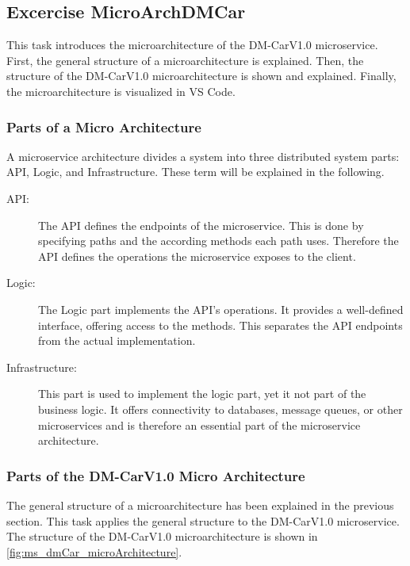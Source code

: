 \subsection{Excercise MicroArchDMCar}
This task introduces the microarchitecture of the DM-CarV1.0 microservice.
First, the general structure of a microarchitecture is explained.
Then, the structure of the DM-CarV1.0 microarchitecture is shown and explained.
Finally, the microarchitecture is visualized in VS Code.

\subsubsection*{Parts of a Micro Architecture}
A microservice architecture divides a system into three distributed system parts: API, Logic, and Infrastructure.
These term will be explained in the following.

\begin{description}
    \item[API:] The API defines the endpoints of the microservice.
                This is done by specifying paths and the according methods each path uses.
                Therefore the API defines the operations the microservice exposes to the client.
    \item[Logic:] The Logic part implements the API's operations.
                It provides a well-defined interface, offering access to the methods.
                This separates the API endpoints from the actual implementation.
    \item[Infrastructure:] This part is used to implement the logic part, yet it not part of the business logic.
                It offers connectivity to databases, message queues, or other microservices and is therefore an essential part of the microservice architecture.
\end{description}

\subsubsection*{Parts of the DM-CarV1.0 Micro Architecture}
The general structure of a microarchitecture has been explained in the previous section.
This task applies the general structure to the DM-CarV1.0 microservice.
The structure of the DM-CarV1.0 microarchitecture is shown in \autoref{fig:ms_dmCar_microArchitecture}.

